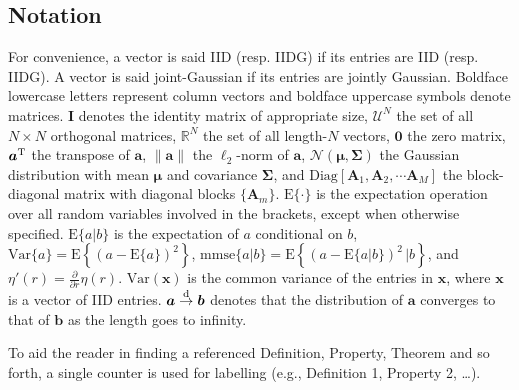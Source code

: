 \documentclass[journal]{IEEEtran}
\newcommand{\mb}{\bm}
\newcommand{\mr}{\mathrm}
\newcommand{\ms}{\mathrm}
\newcommand{\BE}{\begin{equation}}
\newcommand{\EE}{\end{equation}}
\renewcommand{\bf}{\bm}
\renewcommand{\cal}{\mathcal}
\newcommand{\JMC}[1]{\textcolor{magenta}{#1}}
\newcommand{\LC}[1]{\textcolor{red}{#1}}
\begin{document}
\subsection{Notation}
For convenience, a vector is said IID (resp. IIDG) if its entries are IID (resp. IIDG). A vector is said joint-Gaussian if its entries are jointly Gaussian. Boldface lowercase letters represent column vectors and boldface uppercase symbols denote matrices. $\mb{I}$ denotes the identity matrix of appropriate size, $\bf{\mathcal{U}}^N$ the set of all $N\times N$ orthogonal matrices, $\mathbb{R}^N$ the set of all length-$N$ vectors, $\mb{0}$  the zero matrix, $\bm{a}^{\rm T}$ the transpose of $\bm{a}$, $\|\bm{a}\|$  the $\ell_2$-norm of $\bm{a}$, $\cal{N}(\bm{\mu},\bm{\Sigma})$ the Gaussian distribution with mean $\bm{\mu}$ and covariance $\bm{\Sigma}$, and $\mr{Diag}[{\bf{A}}_1,{\bf{A}}_2,\cdots {\bf{A}}_M]$ the block-diagonal matrix with diagonal blocks $\{{\bf{A}}_m\}$. $\ms{E}\{\cdot\}$ is the expectation operation over all random variables involved in the brackets, except when otherwise specified. $\mr{E}\{a|b\}$ is the expectation of $a$ conditional on $b$, $\ms{Var}\{{a}\}=\ms{E}\left\{ ({a} - \ms{E}\{{a}\})^2 \right\}$, $\ms{mmse}\{{a}|{b}\}=\ms{E}\left\{ ({a} - \ms{E}\{{a}|{b}\})^2\,\big|{b} \right\}$, and $\eta'(r)=\frac{\partial}{\partial r} \eta(r)$.  $\mr{Var}(\bf{x})$ is the common variance of the entries in $\bf{x}$, where $\bf{x}$ is a vector of IID entries. $\bf{a} \overset{\rm d}{\to} \bf{b}$ denotes that the distribution of $\bf{a}$ converges to that of $\bf{b}$ as the length goes to infinity. %

To aid the reader in finding a referenced Definition, Property, Theorem and so forth, a single counter is used for labelling (e.g., Definition 1, Property 2, \dots). 









\end{document}
